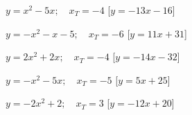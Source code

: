 \begin{esercizio}
\begin{enumeratea}
  \item  $y=x^2 -5 x ; \quad x_T=-4$
   \hfill [$y = -13 x -16$]
  \item  $y=- x^2 - x -5; \quad x_T=-6$
   \hfill [$y = 11 x +31$]
  \item  $y=2 x^2 +2 x ; \quad x_T=-4$
   \hfill [$y = -14 x -32$]
  \item  $y=- x^2 -5 x ; \quad x_T=-5$
   \hfill [$y = 5 x +25$]
  \item  $y=-2 x^2 +2; \quad x_T=3$
   \hfill [$y = -12 x +20$]
 \end{enumeratea}
\end{esercizio}
